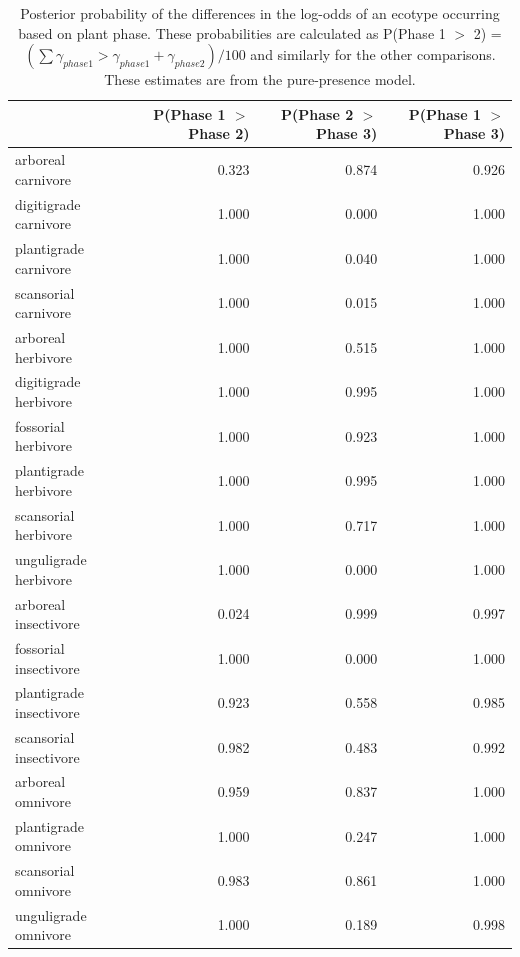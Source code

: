 \documentclass[12pt,letterpaper]{article}
\begin{document}
\begin{table}[ht]
  \centering
  \caption[Posterior probablity estimates of differences in occurrence by plant phase]{Posterior probability of the differences in the log-odds of an ecotype occurring based on plant phase. These probabilities are calculated as P(Phase 1 \(>\) 2) = \( (\sum \gamma_{phase 1} > \gamma_{phase 1} + \gamma_{phase 2}) / 100\) and similarly for the other comparisons. These estimates are from the pure-presence model.}
  \label{tab:occur_plant}
  \begin{tabular}{ l r r r }
    \hline
    & P(Phase 1 $>$ Phase 2) & P(Phase 2 $>$ Phase 3) & P(Phase 1 $>$ Phase 3) \\ 
    \hline
    arboreal carnivore & 0.323 & 0.874 & 0.926 \\ 
    digitigrade carnivore & 1.000 & 0.000 & 1.000 \\ 
    plantigrade carnivore & 1.000 & 0.040 & 1.000 \\ 
    scansorial carnivore & 1.000 & 0.015 & 1.000 \\ 
    arboreal herbivore & 1.000 & 0.515 & 1.000 \\ 
    digitigrade herbivore & 1.000 & 0.995 & 1.000 \\ 
    fossorial herbivore & 1.000 & 0.923 & 1.000 \\ 
    plantigrade herbivore & 1.000 & 0.995 & 1.000 \\ 
    scansorial herbivore & 1.000 & 0.717 & 1.000 \\ 
    unguligrade herbivore & 1.000 & 0.000 & 1.000 \\ 
    arboreal insectivore & 0.024 & 0.999 & 0.997 \\ 
    fossorial insectivore & 1.000 & 0.000 & 1.000 \\ 
    plantigrade insectivore & 0.923 & 0.558 & 0.985 \\ 
    scansorial insectivore & 0.982 & 0.483 & 0.992 \\ 
    arboreal omnivore & 0.959 & 0.837 & 1.000 \\ 
    plantigrade omnivore & 1.000 & 0.247 & 1.000 \\ 
    scansorial omnivore & 0.983 & 0.861 & 1.000 \\ 
    unguligrade omnivore & 1.000 & 0.189 & 0.998 \\ 
    \hline
  \end{tabular}
\end{table}
\end{document}

